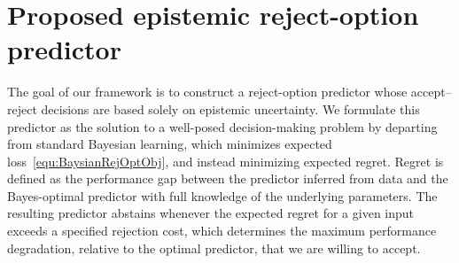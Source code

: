 \section{Proposed epistemic reject-option predictor}
\label{sec:ProposedEpistemRejOption}
The goal of our framework is to construct a reject-option predictor whose accept–reject decisions are based solely on epistemic uncertainty. We formulate this predictor as the solution to a well-posed decision-making problem by departing from standard Bayesian learning, which minimizes expected loss~\eqref{equ:BaysianRejOptObj}, and instead minimizing expected regret. Regret is defined as the performance gap between the predictor inferred from data and the Bayes-optimal predictor with full knowledge of the underlying parameters. The resulting predictor abstains whenever the expected regret for a given input exceeds a specified rejection cost, which determines the maximum performance degradation, relative to the optimal predictor, that we are willing to accept.



